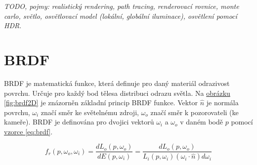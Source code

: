 \documentclass[czech,master,dept460,male,cpp,cpdeclaration]{diploma}
\newcommand{\uvec}[1]{\hat{#1}}
\newcommand{\point}{p}
\newcommand{\brdf}{f_r\left(\point,\omega_{o},\omega_{i}\right)}
\newcommand{\normVec}{\uvec{n}}
\newcommand{\inVec}{\omega_{i}}
\newcommand{\outVec}{\omega_{o}}
\newcommand{\outRadiance}{L_o \left( \point,\outVec \right)}
\newcommand{\inRadiance}{L_i \left( \point,\inVec \right)}
\newcommand{\irradiance}{E \left( \point, \inVec \right)}
\newcommand{\inDotNorm}{\left( \inVec \cdot \normVec \right)}
\begin{document}
\textit{TODO, pojmy:  realistický rendering, path tracing, renderovací rovnice, monte carlo, světlo, osvětlovací model (lokální, globální iluminace), osvětlení pomocí HDR}.

\clearpage
\section{BRDF}
BRDF je matematická funkce, která definuje pro daný materiál odrazivost povrchu. Určuje pro každý bod tělesa distribuci odrazu světla. Na \hyperref[fig:brdf2D]{obrázku \ref{fig:brdf2D}} je znázorněn základní princip BRDF funkce. Vektor \(\normVec\) je normála povrchu, \(\inVec\) značí směr ke světelnému zdroji, \(\outVec\) značí směr k pozorovateli (ke kameře). BRDF je definována pro dvojici vektorů  \(\inVec\) a \(\outVec\) v daném bodě \(p\) pomocí \hyperref[eq:brdf]{vzorce \ref{eq:brdf}}.

\begin{equation} \label{eq:brdf}
    \brdf = \frac{d\outRadiance}{d\irradiance} = \frac{d\outRadiance}{\inRadiance \inDotNorm d\inVec}
\end{equation}
\end{document}
